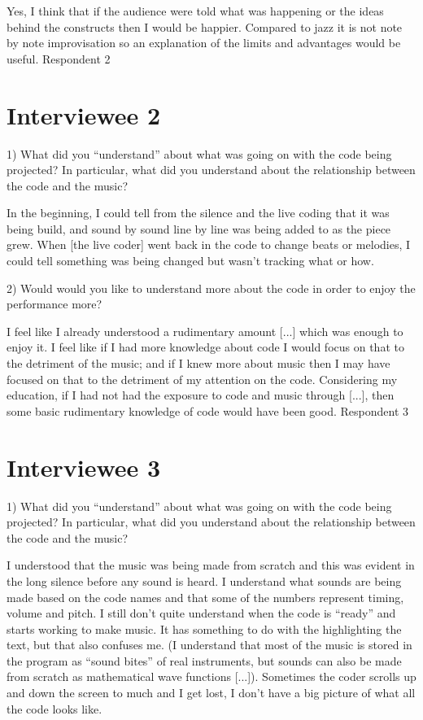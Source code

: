 Yes, I think that if the audience were told what was happening or the ideas behind the constructs then I would be happier. Compared to jazz it is not note by note improvisation so an explanation of the limits and advantages would be useful.
Respondent 2

\section*{Interviewee 2}

1) What did you ``understand'' about what was going on with the code being projected? In particular, what did you understand about the relationship between the code and the music?

In the beginning, I could tell from the silence and the live coding that it was being build, and sound by sound line by line was being added to as the piece grew.  When [the live coder] went back in the code to change beats or melodies, I could tell something was being changed but wasn't tracking what or how.

2) Would would you like to understand more about the code in order to enjoy the performance more?

I feel like I already understood a rudimentary amount [...] which was enough to enjoy it.  I feel like if I had more knowledge about code I would focus on that to the detriment of the music; and if I knew more about music then I may have focused on that to the detriment of my attention on the code.  Considering my education, if I had not had the exposure to code and music through [...], then some basic rudimentary knowledge of code would have been good.
Respondent 3

\section*{Interviewee 3}

1) What did you ``understand'' about what was going on with the code being projected? In particular, what did you understand about the relationship between the code and the music?

I understood that the music was being made from scratch and this was evident in the long silence before any sound is heard. I understand what sounds are being made based on the code names and that some of the numbers represent timing, volume and pitch.  I still don't quite understand when the code is ``ready'' and starts working to make music. It has something to do with the highlighting the text, but that also confuses me. (I understand that most of the music is stored in the program as ``sound bites'' of real instruments, but sounds can also be made from scratch as mathematical wave functions [...]). Sometimes the coder scrolls up and down the screen to much and I get lost, I don't have a big picture of what all the code looks like.

